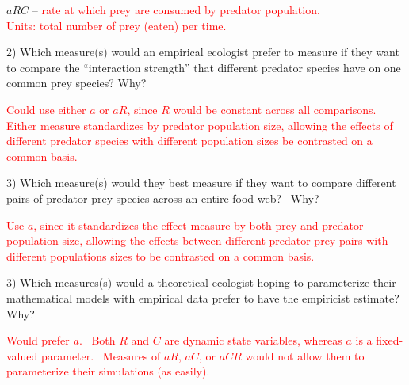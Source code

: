 \documentclass{article}
\begin{document}
$aRC$ --
	\textcolor{red}{
		rate at which prey are consumed by predator population.\\
		Units: total number of prey (eaten) per time.
}
\vspace{1 cm}


2) Which measure(s) would an empirical ecologist prefer to measure if they want to compare the ``interaction strength'' that different predator species have on one common prey species?  Why?

\vspace{0.1 cm}
\textcolor{red}{
	Could use either $a$ or $aR$, since $R$ would be constant across all comparisons. Either measure standardizes by predator population size, allowing the effects of different predator species with different population sizes be contrasted on a common basis. 
}
\vspace{1 cm}


3) Which measure(s) would they best measure if they want to compare different pairs of predator-prey species across an entire food web?  Why?

\vspace{0.1 cm}
\textcolor{red}{
	Use $a$, since it standardizes the effect-measure by both prey and predator population size, allowing the effects between different predator-prey pairs with different populations sizes to be contrasted on a common basis.
}
\vspace{1 cm}


3) Which measures(s) would a theoretical ecologist hoping to parameterize their mathematical models with empirical data prefer to have the empiricist estimate?  Why?

\vspace{0.1 cm}
\textcolor{red}{
	Would prefer $a$.  Both $R$ and $C$ are dynamic state variables, whereas $a$ is a fixed-valued parameter.  Measures of $a R$, $a C$, or $a C R$ would not allow them to parameterize their simulations (as easily). 
}
\end{document}
